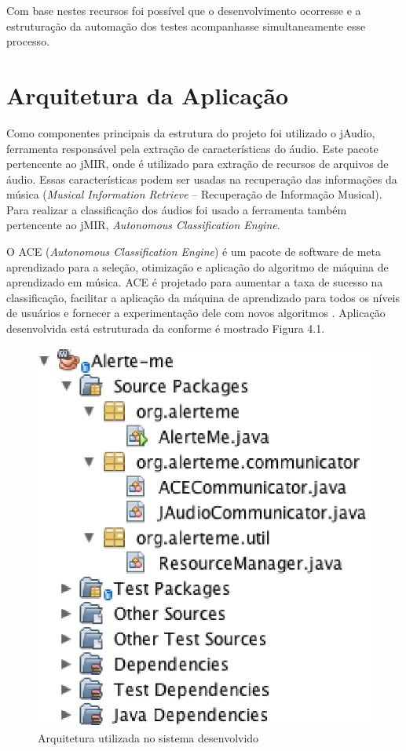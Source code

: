 Com base nestes recursos foi possível que o desenvolvimento ocorresse e a estruturação da automação dos testes acompanhasse simultaneamente esse processo. 

\section{Arquitetura da Aplicação}

Como componentes principais da estrutura do projeto foi utilizado o jAudio, ferramenta responsável pela extração de características do áudio. Este pacote pertencente ao jMIR, onde é utilizado para extração de recursos de arquivos de áudio. Essas características podem ser usadas na recuperação das informações da música (\textit{Musical Information Retrieve} – Recuperação de Informação Musical). Para realizar a classificação dos áudios foi usado a ferramenta também pertencente ao jMIR, \textit{Autonomous Classification Engine}.

O ACE (\textit{Autonomous Classification Engine}) é um pacote de software de meta aprendizado para a seleção, otimização e aplicação do algoritmo de máquina de aprendizado em música. ACE é projetado para aumentar a taxa de sucesso na classificação, facilitar a aplicação da máquina de aprendizado para todos os níveis de usuários e fornecer a experimentação dele com novos algoritmos \cite{ace}. Aplicação desenvolvida está estruturada da conforme é mostrado Figura 4.1.

\begin{figure}[H]
	\centering
	\captionsetup{justification=centering,margin=2cm}
	\includegraphics[scale=0.80]{capitulos/validacao/figuras/arquiteturaDoSistemaDesenvolvido.eps}
	\caption{Arquitetura utilizada no sistema desenvolvido}
	\label{fig:result-engajamento}
\end{figure}

